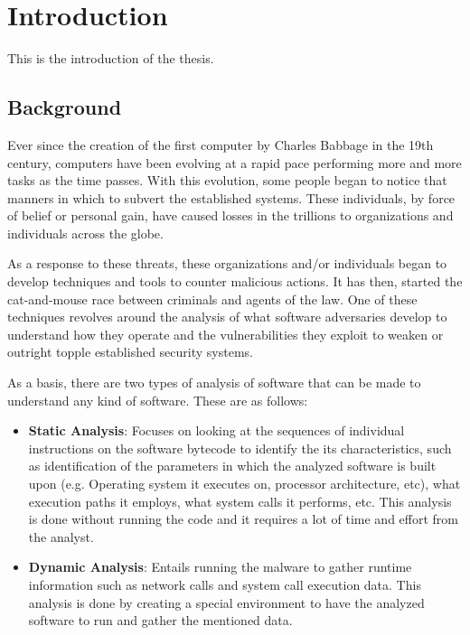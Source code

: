 
\chapter{Introduction}
\label{sec:introduction}

\label{Chapter1} %

This is the introduction of the thesis.

\section{Background}
Ever since the creation of the first computer by Charles Babbage in the 19th century, computers
have been evolving at a rapid pace performing more and more tasks as the time passes. With this
evolution, some people began to notice that manners in which to subvert the established systems.
These individuals, by force of belief or personal gain, have caused losses in the trillions to
organizations and individuals across the globe.

As a response to these threats, these organizations and/or individuals began to develop techniques
and tools to counter malicious actions. It has then, started the cat-and-mouse race between
criminals and agents of the law. One of these techniques revolves around the analysis of what
software adversaries develop to understand how they operate and the vulnerabilities they exploit to
weaken or outright topple established security systems.

As a basis, there are two types of analysis of software that can be made to understand any kind of
software. These are as follows:
\begin{itemize}
	\item \textbf{Static Analysis}: Focuses on looking at the sequences of individual instructions on the software
	      bytecode to identify the its characteristics, such as identification of the parameters in which the
	      analyzed software is built upon (e.g. Operating system it executes on, processor architecture,
	      etc), what execution paths it employs, what system calls it performs, etc. This analysis is done
	      without running the code and it requires a lot of time and effort from the analyst.
	\item \textbf{Dynamic Analysis}: Entails running the malware to gather runtime information such as network calls
	      and system call execution data. This analysis is done by creating a special environment to have the
	      analyzed software to run and gather the mentioned data.
\end{itemize}

